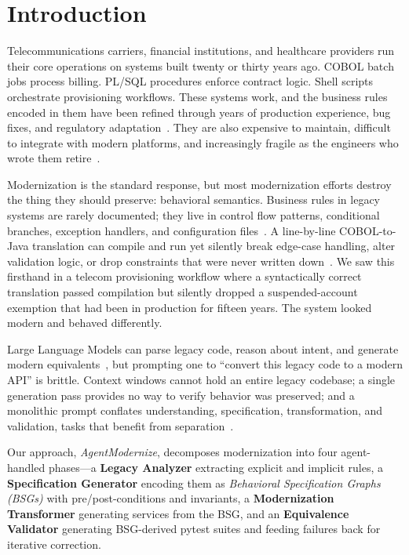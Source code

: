 \documentclass[conference]{IEEEtran}
\begin{document}
\section{Introduction}

Telecommunications carriers, financial institutions, and healthcare providers run their core operations on systems built twenty or thirty years ago. COBOL batch jobs process billing. PL/SQL procedures enforce contract logic. Shell scripts orchestrate provisioning workflows. These systems work, and the business rules encoded in them have been refined through years of production experience, bug fixes, and regulatory adaptation~\cite{comella2000survey}. They are also expensive to maintain, difficult to integrate with modern platforms, and increasingly fragile as the engineers who wrote them retire~\cite{breivold2012systematic}.

Modernization is the standard response, but most modernization efforts destroy the thing they should preserve: behavioral semantics. Business rules in legacy systems are rarely documented; they live in control flow patterns, conditional branches, exception handlers, and configuration files~\cite{kazman1998requirements}. A line-by-line COBOL-to-Java translation can compile and run yet silently break edge-case handling, alter validation logic, or drop constraints that were never written down~\cite{rugaber2004model}. We saw this firsthand in a telecom provisioning workflow where a syntactically correct translation passed compilation but silently dropped a suspended-account exemption that had been in production for fifteen years. The system looked modern and behaved differently.

Large Language Models can parse legacy code, reason about intent, and generate modern equivalents~\cite{chen2021evaluating}, but prompting one to ``convert this legacy code to a modern API'' is brittle. Context windows cannot hold an entire legacy codebase; a single generation pass provides no way to verify behavior was preserved; and a monolithic prompt conflates understanding, specification, transformation, and validation, tasks that benefit from separation~\cite{hou2024llm4se}.

Our approach, \textit{AgentModernize}, decomposes modernization into four agent-handled phases---a \textbf{Legacy Analyzer} extracting explicit and implicit rules, a \textbf{Specification Generator} encoding them as \textit{Behavioral Specification Graphs (BSGs)} with pre/post-conditions and invariants, a \textbf{Modernization Transformer} generating services from the BSG, and an \textbf{Equivalence Validator} generating BSG-derived pytest suites and feeding failures back for iterative correction.
\end{document}
